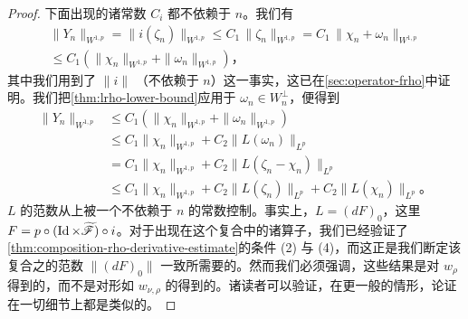\begin{proof}
下面出现的诸常数 $C_{i}$ 都不依赖于 $n$。我们有
\[
\begin{aligned}
\|Y_{n}\|_{W^{1,p}}=\|i(\zeta_{n})\|_{W^{1,p}}\le C_{1}\,\|\zeta_{n}\|_{W^{1,p}}=C_{1}\,\|\chi_{n}+\omega_{n}\|_{W^{1,p}}\\
\le C_{1}\left(\|\chi_{n}\|_{W^{1,p}}+\|\omega_{n}\|_{W^{1,p}}\right)\text{，}
\end{aligned}
\]
其中我们用到了 $\|i\|$ \trBounded（不依赖于 $n$）这一事实，这已在\cref{sec:operator-frho}中证明。我们把\cref{thm:lrho-lower-bound}应用于 $\omega_{n}\in W_{n}^{\perp}$，便得到
\[
\begin{aligned}
\|Y_{n}\|_{W^{1,p}}&\le C_{1}\left(\|\chi_{n}\|_{W^{1,p}}+\|\omega_{n}\|_{W^{1,p}}\right)\\
&\le C_{1}\|\chi_{n}\|_{W^{1,p}}+C_{2}\|L(\omega_{n})\|_{L^{p}}\\
&=C_{1}\|\chi_{n}\|_{W^{1,p}}+C_{2}\|L(\zeta_{n}-\chi_{n})\|_{L^{p}}\\
&\le C_{1}\|\chi_{n}\|_{W^{1,p}}+C_{2}\|L(\zeta_{n})\|_{L^{p}}+C_{2}\|L(\chi_{n})\|_{L^{p}}\text{。}
\end{aligned}
\]
\trLinearOperator{} $L$ 的范数从上被一个不依赖于 $n$ 的常数控制。事实上，$L=(dF)_{0}$，这里 $F=p\circ(\operatorname{Id}\times\widetilde{\mathscr{F}})\circ i$。对于出现在这个复合中的诸算子，我们已经验证了\cref{thm:composition-rho-derivative-estimate}的条件 (2) 与 (4)，而这正是我们断定该复合之\trDifferential{}的范数 $\|(dF)_{0}\|$ 一致\trBounded{}所需要的。然而我们必须强调，这些结果是对\trPregluing{} $w_{\rho}$ 得到的，而不是对形如 $w_{\nu,\rho}$ 的\trPregluing{}得到的。诸读者可以验证，在更一般的情形，论证在一切细节上都是类似的。


\end{proof}
